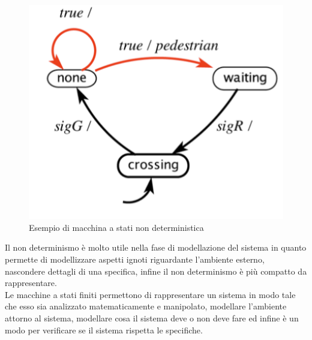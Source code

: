 \begin{figure}
\centering
\includegraphics[scale=0.5]{img/nondetfsm.png}
\caption{Esempio di macchina a stati non deterministica}\label{fig:nondetfsm}
\end{figure}
Il non determinismo è molto utile nella fase di modellazione del sistema in quanto permette di modellizzare aspetti ignoti riguardante l'ambiente esterno, nascondere dettagli di una specifica, infine il non determinismo è più compatto da rappresentare.\\
Le macchine a stati finiti permettono di rappresentare un sistema in modo tale che esso sia analizzato matematicamente e manipolato, modellare l'ambiente attorno al sistema, modellare cosa il sistema deve o non deve fare ed infine è un modo per verificare se il sistema rispetta le specifiche.
